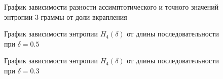\documentclass[a4paper,12pt]{article}
\theoremstyle{plain}
\begin{document}
			\begin{figure}[h]
				\caption{График зависимости разности ассимптотического и точного значений энтропии 3-граммы от доли вкрапления}
				\label{ris:"h3.png"}
			\end{figure}
			\begin{figure}[h]
				\caption{График зависимости энтропии $H_4{(\delta)}$ от длины последовательности при  $\delta = 0.5$}
				\label{ris:"h4_05.png"}
			\end{figure}
				\begin{figure}[h]
					\caption{График зависимости энтропии $H_4{(\delta)}$ от длины последовательности при  $\delta = 0.3$}
					\label{ris:"h4_03.png"}
				\end{figure}
\end{document}
